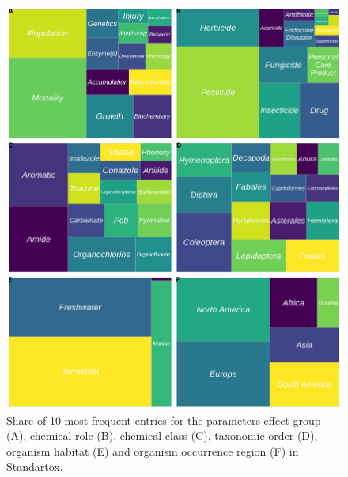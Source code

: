\begin{figure}[h!]
    \includegraphics[width=1.0\textwidth]{article/figures/standartox_parameters.png}
    \caption{Share of 10 most frequent entries for the parameters effect group (A), chemical role (B), chemical class (C), taxonomic order (D), organism habitat (E) and organism occurrence region (F) in Standartox.}
    \label{fig:stx-parameters}
\end{figure}

